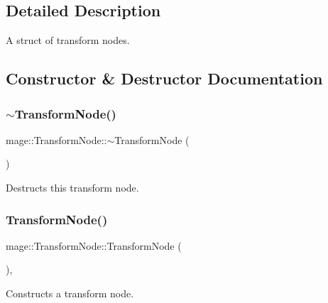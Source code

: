 \subsection{Detailed Description}
A struct of transform nodes. 

\subsection{Constructor \& Destructor Documentation}
\hypertarget{classmage_1_1_transform_node_a0c5e84d99c27cda31dae8106611d682f}{}\label{classmage_1_1_transform_node_a0c5e84d99c27cda31dae8106611d682f} 
\subsubsection{\texorpdfstring{$\sim$\+Transform\+Node()}{~TransformNode()}}
{\footnotesize\ttfamily mage\+::\+Transform\+Node\+::$\sim$\+Transform\+Node (\begin{DoxyParamCaption}{ }\end{DoxyParamCaption})}

Destructs this transform node. \hypertarget{classmage_1_1_transform_node_aec41a87ef5f7bca905e1de4b8959350a}{}\label{classmage_1_1_transform_node_aec41a87ef5f7bca905e1de4b8959350a} 
\subsubsection{\texorpdfstring{Transform\+Node()}{TransformNode()}\hspace{0.1cm}{\footnotesize\ttfamily [1/3]}}
{\footnotesize\ttfamily mage\+::\+Transform\+Node\+::\+Transform\+Node (\begin{DoxyParamCaption}{ }\end{DoxyParamCaption})\hspace{0.3cm}{\ttfamily [explicit]}, {\ttfamily [private]}}

Constructs a transform node. \hypertarget{classmage_1_1_transform_node_a6ee41dcccf0aba7f904f1617444411d4}{}\label{classmage_1_1_transform_node_a6ee41dcccf0aba7f904f1617444411d4} 
